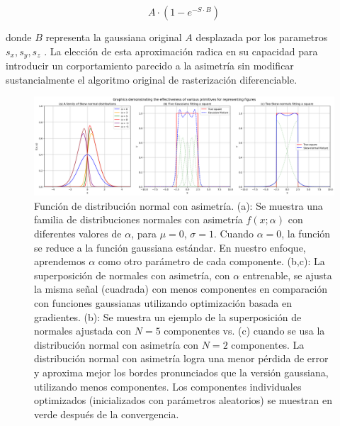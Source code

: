 \begin{equation}
    A \cdot (1-e^{-S \cdot B})
\end{equation}    

donde $B$ representa la gaussiana original $A$ desplazada por los parametros $s_x, s_y, s_z$ . La elección de esta aproximación radica en su capacidad 
para introducir un corportamiento parecido a la asimetría sin modificar sustancialmente el algoritmo original de rasterización diferenciable.

\begin{figure}[htbp]
    \centering
    \includegraphics[width=1\textwidth]{Graphics/square.png}
    \caption{Función de distribución normal con asimetría. 
    (a): Se muestra una familia de distribuciones normales con asimetría \(f(x; \alpha)\) con diferentes valores de \(\alpha\), 
    para \(\mu = 0\), \(\sigma = 1\). Cuando \(\alpha = 0\), la función se reduce a la función gaussiana estándar. 
    En nuestro enfoque, aprendemos \(\alpha\) como otro parámetro de cada componente. 
    (b,c): La superposición de normales con asimetría, con \(\alpha\) entrenable, 
    se ajusta la misma señal (cuadrada) con menos componentes en comparación con funciones gaussianas utilizando optimización basada en gradientes. 
    (b): Se muestra un ejemplo de la superposición de normales ajustada con \(N = 5\) componentes vs. 
    (c) cuando se usa la distribución normal con asimetría con \(N = 2\) componentes. La distribución normal con asimetría logra una menor pérdida de error y 
    aproxima mejor los bordes pronunciados que la versión gaussiana, utilizando menos componentes. Los componentes individuales optimizados 
    (inicializados con parámetros aleatorios) se muestran en verde después de la convergencia.}
    \label{fig:square}
\end{figure}    

